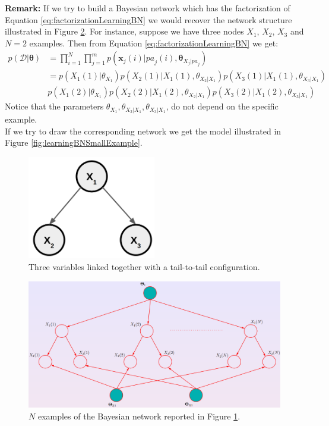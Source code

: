 \textbf{Remark:} If we try to build a Bayesian network which has the factorization of Equation \ref{eq:factorizationLearningBN} we would recover the network structure illustrated in Figure \ref{fig:learningBNExample1}. For instance, suppose we have three nodes $X_1$, $X_2$, $X_3$ and $N=2$ examples. Then from Equation \ref{eq:factorizationLearningBN} we get:
\begin{align*}
    p(\mathcal{D}|\pmb{\theta}) &= \prod_{i=1}^N \prod_{j=1}^m p(\pmb{x}_j(i) | \mathit{pa}_j(i), \pmb{\theta}_{X_j | \mathit{pa}_j}) \\
    &= p(X_1(1) | \theta_{X_1}) p(X_2(1)|X_1(1), \theta_{X_2|X_1}) p(X_3(1) | X_1(1), \theta_{X_3|X_1})\\
    & p(X_1(2) | \theta_{X_1}) p(X_2(2)|X_1(2), \theta_{X_2|X_1}) p(X_3(2) | X_1(2), \theta_{X_3|X_1})
\end{align*}
Notice that the parameters $\theta_{X_1}, \theta_{X_2|X_1}, \theta_{X_3|X_1}$, do not depend on the specific example.\\
If we try to draw the corresponding network we get the model illustrated in Figure \ref{fig:learningBNSmallExample}.

\begin{figure}
    \centering
    \includegraphics[width=0.5\textwidth]{images/tailToTailLearningBN.png}
    \caption{Three variables linked together with a tail-to-tail configuration.}
    \label{fig:tailToTailLearningBN}
\end{figure}

\begin{figure}
    \centering
    \includegraphics[width=\textwidth]{images/learningBNExample1.png}
    \caption{$N$ examples of the Bayesian network reported in Figure \ref{fig:tailToTailLearningBN}.}
    \label{fig:learningBNExample1}
\end{figure}

